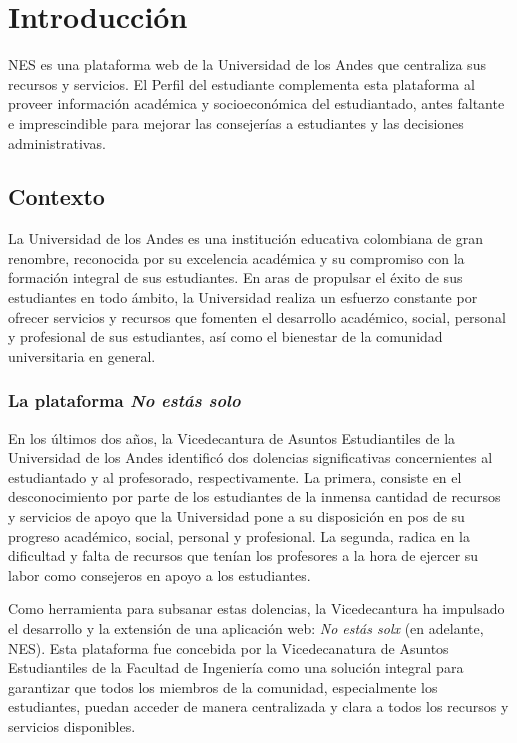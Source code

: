 \chapter{Introducción}

\begin{resumen}
	\gls{NES} es una plataforma web de la Universidad de los Andes que centraliza sus recursos y servicios. El Perfil del estudiante complementa esta plataforma al proveer información académica y socioeconómica del estudiantado, antes faltante e imprescindible para mejorar las consejerías a estudiantes y las decisiones administrativas.
\end{resumen}

\section{Contexto}

La Universidad de los Andes es una institución educativa colombiana de gran renombre, reconocida por su excelencia académica y su compromiso con la formación integral de sus estudiantes. En aras de propulsar el éxito de sus estudiantes en todo ámbito, la Universidad realiza un esfuerzo constante por ofrecer servicios y recursos que fomenten el desarrollo académico, social, personal y profesional de sus estudiantes, así como el bienestar de la comunidad universitaria en general.

\subsection{La plataforma \textit{No estás solo}}

En los últimos dos años, la Vicedecantura de Asuntos Estudiantiles de la Universidad de los Andes identificó dos dolencias significativas concernientes al estudiantado y al profesorado, respectivamente. La primera, consiste en el desconocimiento por parte de los estudiantes de la inmensa cantidad de recursos y servicios de apoyo que la Universidad pone a su disposición en pos de su progreso académico, social, personal y profesional. La segunda, radica en la dificultad y falta de recursos que tenían los profesores a la hora de ejercer su labor como consejeros en apoyo a los estudiantes.

Como herramienta para subsanar estas dolencias, la Vicedecantura ha impulsado el desarrollo y la extensión de una aplicación web: \textit{No estás solx} (en adelante, \gls{NES}). Esta plataforma fue concebida por la Vicedecanatura de Asuntos Estudiantiles de la Facultad de Ingeniería como una solución integral para garantizar que todos los miembros de la comunidad, especialmente los estudiantes, puedan acceder de manera centralizada y clara a todos los recursos y servicios disponibles.

